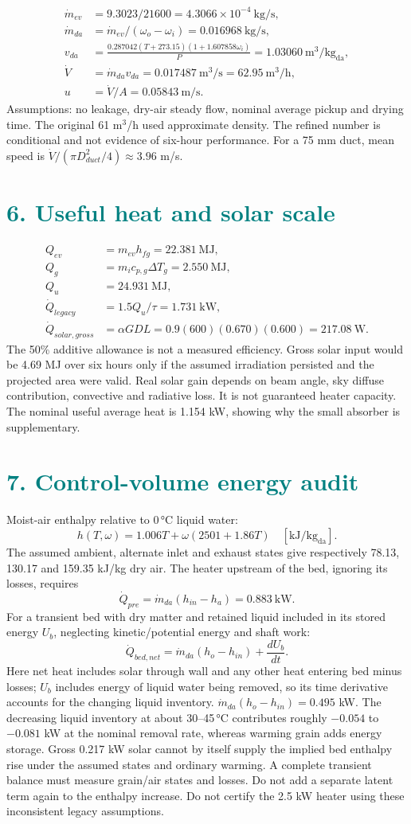 \documentclass[11pt,a4paper]{article}
\newcommand{\sect}[1]{\section*{\textcolor{teal}{#1}}}
\begin{document}
\begin{align}
\dot m_{ev}&=9.3023/21600=4.3066\times10^{-4}\ \mathrm{kg/s},\\
\dot m_{da}&=\dot m_{ev}/(\omega_o-\omega_i)=0.016968\ \mathrm{kg/s},\\
v_{da}&=\frac{0.287042(T+273.15)(1+1.607858\omega_i)}{P}=1.03060\ \mathrm{m^3/kg_{da}},\\
\dot V&=\dot m_{da}v_{da}=0.017487\ \mathrm{m^3/s}=62.95\ \mathrm{m^3/h},\\
u&=\dot V/A=0.05843\ \mathrm{m/s}.
\end{align}
Assumptions: no leakage, dry-air steady flow, nominal average pickup and drying time. The original 61 m$^3$/h used approximate density. The refined number is conditional and not evidence of six-hour performance. For a 75 mm duct, mean speed is $\dot V/(\pi D_{duct}^2/4)\approx3.96$ m/s.
\sect{6. Useful heat and solar scale}
\begin{align}
Q_{ev}&=m_{ev}h_{fg}=22.381\ \mathrm{MJ},\\
Q_g&=m_i c_{p,g}\Delta T_g=2.550\ \mathrm{MJ},\\
Q_u&=24.931\ \mathrm{MJ},\\
\dot Q_{legacy}&=1.5Q_u/\tau=1.731\ \mathrm{kW},\\
\dot Q_{solar,gross}&=\alpha GDL=0.9(600)(0.670)(0.600)=217.08\ \mathrm W.
\end{align}
The 50\% additive allowance is not a measured efficiency. Gross solar input would be 4.69 MJ over six hours only if the assumed irradiation persisted and the projected area were valid. Real solar gain depends on beam angle, sky diffuse contribution, convective and radiative loss. It is not guaranteed heater capacity. The nominal useful average heat is 1.154 kW, showing why the small absorber is supplementary.
\newpage
\sect{7. Control-volume energy audit}
Moist-air enthalpy relative to 0\,\si{\celsius} liquid water:
\[h(T,\omega)=1.006T+\omega(2501+1.86T)\quad[\mathrm{kJ/kg_{da}}].\]
The assumed ambient, alternate inlet and exhaust states give respectively 78.13, 130.17 and 159.35 kJ/kg dry air. The heater upstream of the bed, ignoring its losses, requires
\[\dot Q_{pre}=\dot m_{da}(h_{in}-h_a)=0.883\ \mathrm{kW}.\]
For a transient bed with dry matter and retained liquid included in its stored energy $U_b$, neglecting kinetic/potential energy and shaft work:
\[\dot Q_{bed,net}=\dot m_{da}(h_o-h_{in})+\frac{dU_b}{dt}.\]
Here net heat includes solar through wall and any other heat entering bed minus losses; $U_b$ includes energy of liquid water being removed, so its time derivative accounts for the changing liquid inventory. $\dot m_{da}(h_o-h_{in})=0.495$ kW. The decreasing liquid inventory at about 30--45\,\si{\celsius} contributes roughly $-0.054$ to $-0.081$ kW at the nominal removal rate, whereas warming grain adds energy storage. Gross 0.217 kW solar cannot by itself supply the implied bed enthalpy rise under the assumed states and ordinary warming. A complete transient balance must measure grain/air states and losses. Do not add a separate latent term again to the enthalpy increase. Do not certify the 2.5 kW heater using these inconsistent legacy assumptions.\par
\end{document}
